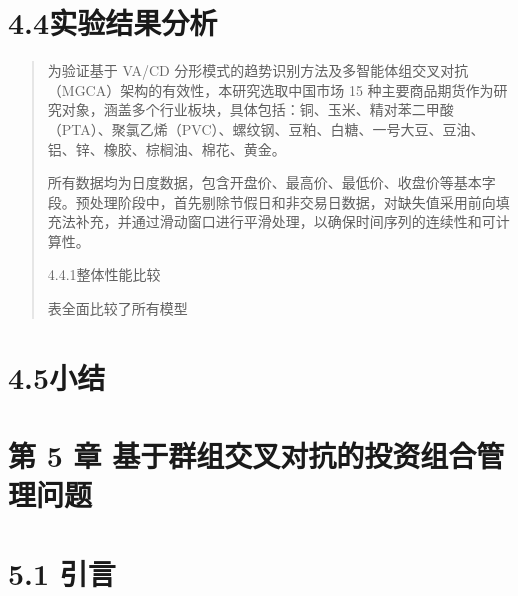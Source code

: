 \section{4.4实验结果分析}

\begin{quote}
为验证基于 VA/CD
分形模式的趋势识别方法及多智能体组交叉对抗（MGCA）架构的有效性，本研究选取中国市场
15
种主要商品期货作为研究对象，涵盖多个行业板块，具体包括：铜、玉米、精对苯二甲酸（PTA）、聚氯乙烯（PVC）、螺纹钢、豆粕、白糖、一号大豆、豆油、铝、锌、橡胶、棕榈油、棉花、黄金。

所有数据均为日度数据，包含开盘价、最高价、最低价、收盘价等基本字段。预处理阶段中，首先剔除节假日和非交易日数据，对缺失值采用前向填充法补充，并通过滑动窗口进行平滑处理，以确保时间序列的连续性和可计算性。

4.4.1整体性能比较

表全面比较了所有模型
\end{quote}

\section{4.5小结}

\section{第 5 章
基于群组交叉对抗的投资组合管理问题}

\section{5.1 引言}

